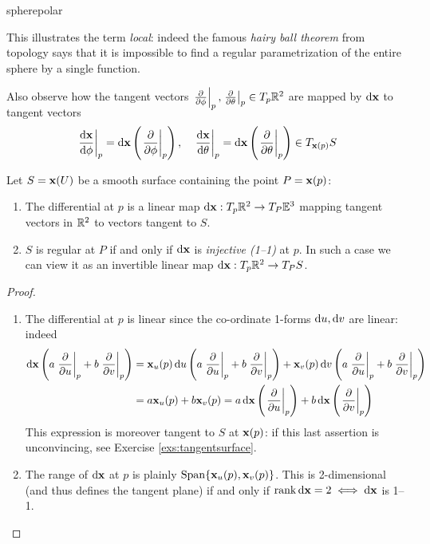 \begin{example}{}{spherepolar}
\begin{minipage}{0.44\linewidth}
	\end{minipage}
	\medbreak
 	This illustrates the term \emph{local}: indeed the famous \emph{hairy ball theorem} from topology says that it is impossible to find a regular parametrization of the entire sphere by a single function.
 	\par
	Also observe how the tangent vectors $\smash[b]{\partialsat\phi p,\partialsat\theta p}\in T_p\R^2$ are mapped by $\dvx$ to tangent vectors
	\[
		\diffat[\vx]{\phi}p=\dvx\left(\partialsat\phi p\right),\quad \diffat[\vx]{\theta}p=\dvx\left(\partialsat\theta p\right)\in T_{\vx(p)}S
	\]
\end{example}

\goodbreak

\begin{thm}{}{}
	Let $S=\vx(U)$ be a smooth surface containing the point $P=\vx(p)$:
	\begin{enumerate}
	  \item The differential at $p$ is a linear map $\dvx:T_p\R^2\to T_P\E^3$ mapping tangent vectors in $\R^2$ to vectors tangent to $S$.
	  \item $S$ is regular at $P$ if and only if $\dvx$ is \emph{injective (1--1)} at $p$. In such a case we can view it as an invertible linear map $\dvx:T_p\R^2\to T_PS$.
	\end{enumerate}
\end{thm}

\begin{proof}
	\begin{enumerate}
	  \item The differential at $p$ is linear since the co-ordinate 1-forms $\du,\dv$ are linear: indeed
	  \begin{align*}
	  \dvx\left(a\partialsat up+b\partialsat vp\right)&=\vx_u(p)\,\du\left(a\partialsat up+b\partialsat vp\right)+\vx_v(p)\,\dv\left(a\partialsat up+b\partialsat vp\right)\\
	  &=a\vx_u(p)+b\vx_v(p) =a\,\dvx\left(\partialsat up\right)+b\,\dvx\left(\partialsat vp\right)
	  \end{align*}
	  This expression is moreover tangent to $S$ at $\vx(p)$: if this last assertion is unconvincing, see Exercise \ref{exs:tangentsurface}.

		\item The range of $\dvx$ at $p$ is plainly $\Span\{\vx_u(p),\vx_v(p)\}$. This is 2-dimensional (and thus defines the tangent plane) if and only if $\Rank \dvx=2\iff \dvx$ is 1--1.\qedhere
	\end{enumerate}
\end{proof}


